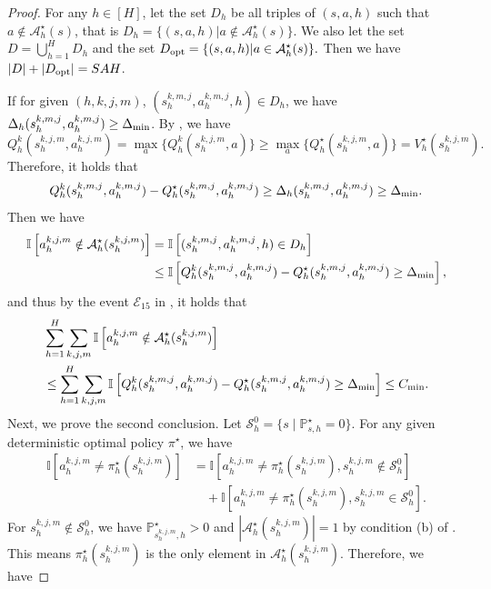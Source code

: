 \documentclass{article}
\def\dmin{\Delta_{\textnormal{min}}}
\begin{document}
\begin{proof}
    For any $h \in [H]$, let the set $D_h$ be all triples of $(s,a,h)$ such that $a \notin \mathcal{A}_h^\star(s)$, that is $D_h = \{(s,a,h) | a \notin \mathcal{A}_h^\star(s) \}.$ We also let the set $D = \bigcup_{h=1}^{H}D_h$ and the set 
    $D_{\textnormal{opt}} = \{(s,a,h) | a \in \mathcal{A}_h^\star(s)\}.$
    Then we have $|D| + |D_{\textnormal{opt}}| =SAH$.

    
    If for given $(h,k,j,m)$, $(s_h^{k,m,j},a_h^{k,m,j}, h) \in D_h$, we have $\Delta_h(s_h^{k,m,j},a_h^{k,m,j}) \geq \dmin$. By , we have
$$Q_h^k (s_h^{k,j,m}, a_h^{k,j,m}) = \max_a\{Q_h^k (s_h^{k,j,m},a) \} \geq \max_a\{Q_h^{\star} (s_h^{k,j,m},a) \} = V_h^{\star}(s_h^{k,j,m}).$$
Therefore, it holds that
    $$Q_h^k(s_h^{k,m,j},a_h^{k,m,j}) - Q_h^\star(s_h^{k,m,j},a_h^{k,m,j}) \geq   \Delta_h(s_h^{k,m,j},a_h^{k,m,j}) \geq \dmin.$$
   Then we have 
    \begin{align*}
        \mathbb{I}\left[a_h^{k,j,m} \notin \mathcal{A}_h^{\star}(s_h^{k,j,m})\right]& =  \mathbb{I}\left[(s_h^{k,m,j},a_h^{k,m,j},h) \in D_h\right] \\
        &\leq  \mathbb{I}\left[Q_h^k(s_h^{k,m,j},a_h^{k,m,j}) - Q_h^\star(s_h^{k,m,j},a_h^{k,m,j}) \geq \dmin\right],
    \end{align*}
    and thus by the event $\mathcal{E}_{15}$ in , it holds that
    \begin{align}
    \label{firstconclusion}
        &\sum_{h=1}^H\sum_{k,j,m}\mathbb{I}\left[a_h^{k,j,m} \notin \mathcal{A}_h^{\star}(s_h^{k,j,m})\right]  \nonumber\\
        &\leq  \sum_{h=1}^H\sum_{k,j,m} \mathbb{I}\left[Q_h^k(s_h^{k,m,j},a_h^{k,m,j}) - Q_h^\star(s_h^{k,m,j},a_h^{k,m,j}) \geq \dmin\right] \leq  C_{\textnormal{min}}.
    \end{align}
    Next, we prove the second conclusion. Let $\mathcal{S}_h^0 = \{s \mid \mathbb{P}_{s,h}^{\star} = 0\}$. For any given deterministic optimal policy $\pi^{\star}$, we have
    \begin{align}
    \label{notequal}
        \mathbb{I}\left[a_h^{k,j,m} \neq \pi_h^{\star}(s_h^{k,j,m})\right] &= \mathbb{I}\left[a_h^{k,j,m} \neq \pi_h^{\star}(s_h^{k,j,m}), s_h^{k,j,m} \notin \mathcal{S}_h^0 \right] \nonumber\\
        &\quad + \mathbb{I}\left[a_h^{k,j,m} \neq \pi_h^{\star}(s_h^{k,j,m}), s_h^{k,j,m} 
    \in \mathcal{S}_h^0\right].
    \end{align}
    For $s_h^{k,j,m} \notin \mathcal{S}_h^0$, we have $\mathbb{P}_{s_h^{k,j,m},h}^{\star} >0$ and $|\mathcal{A}_h^{\star}(s_h^{k,j,m})| = 1$ by condition (b) of . This means $\pi_h^{\star}(s_h^{k,j,m})$ is the only element in $\mathcal{A}_h^{\star}(s_h^{k,j,m})$. Therefore, we have

\end{proof}
\end{document}
